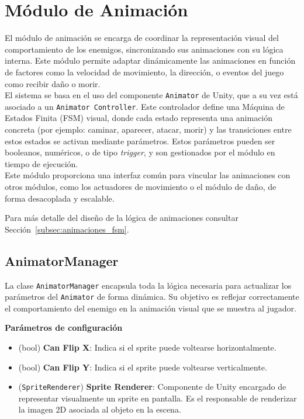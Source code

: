 \section{Módulo de Animación} \label{sec:animation}

El módulo de animación se encarga de coordinar la representación visual del comportamiento de los enemigos, sincronizando sus animaciones con su lógica interna. Este módulo permite adaptar dinámicamente las animaciones en función de factores como la velocidad de movimiento, la dirección, o eventos del juego como recibir daño o morir.\\

El sistema se basa en el uso del componente \texttt{Animator} de Unity, que a su vez está asociado a un \texttt{Animator Controller}. Este controlador define una Máquina de Estados Finita (FSM) visual, donde cada estado representa una animación concreta (por ejemplo: caminar, aparecer, atacar, morir) y las transiciones entre estos estados se activan mediante parámetros. Estos parámetros pueden ser booleanos, numéricos, o de tipo \textit{trigger}, y son gestionados por el módulo en tiempo de ejecución.\\

Este módulo proporciona una interfaz común para vincular las animaciones con otros módulos, como los actuadores de movimiento o el módulo de daño, de forma desacoplada y escalable.

Para más detalle del diseño de la lógica de animaciones consultar Sección~\ref{subsec:animaciones_fsm}.

\subsection{AnimatorManager}

La clase \texttt{AnimatorManager} encapsula toda la lógica necesaria para actualizar los parámetros del \texttt{Animator} de forma dinámica. Su objetivo es reflejar correctamente el comportamiento del enemigo en la animación visual que se muestra al jugador.

\textbf{Parámetros de configuración}
\begin{itemize}
	\item (bool) \textbf{Can Flip X}: Indica si el sprite puede voltearse horizontalmente.
	\item (bool) \textbf{Can Flip Y}: Indica si el sprite puede voltearse verticalmente. 
	\item (\texttt{SpriteRenderer}) \textbf{Sprite Renderer}: Componente de Unity encargado de representar visualmente un sprite en pantalla. Es el responsable de renderizar la imagen 2D asociada al objeto en la escena.

\end{itemize}

